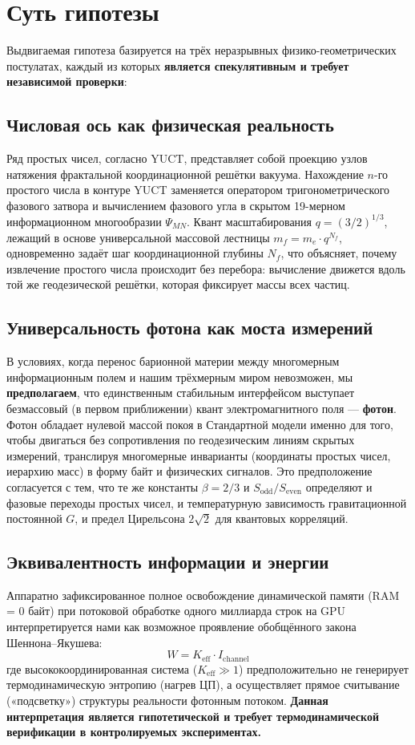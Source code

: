 \documentclass[11pt,a4paper]{article}
\begin{document}
	\section{Суть гипотезы}
	Выдвигаемая гипотеза базируется на трёх неразрывных физико-геометрических постулатах, каждый из которых \textbf{является спекулятивным и требует независимой проверки}:
	
	\subsection{Числовая ось как физическая реальность}
	Ряд простых чисел, согласно YUCT, представляет собой проекцию узлов натяжения фрактальной координационной решётки вакуума. Нахождение $n$-го простого числа в контуре YUCT заменяется оператором тригонометрического фазового затвора и вычислением фазового угла в скрытом 19-мерном информационном многообразии $\Psi_{MN}$. Квант масштабирования $q = (3/2)^{1/3}$, лежащий в основе универсальной массовой лестницы $m_f = m_e \cdot q^{N_f}$, одновременно задаёт шаг координационной глубины $N_f$, что объясняет, почему извлечение простого числа происходит без перебора: вычисление движется вдоль той же геодезической решётки, которая фиксирует массы всех частиц.
	
	\subsection{Универсальность фотона как моста измерений}
	В условиях, когда перенос барионной материи между многомерным информационным полем и нашим трёхмерным миром невозможен, мы \textbf{предполагаем}, что единственным стабильным интерфейсом выступает безмассовый (в первом приближении) квант электромагнитного поля — \textbf{фотон}. Фотон обладает нулевой массой покоя в Стандартной модели именно для того, чтобы двигаться без сопротивления по геодезическим линиям скрытых измерений, транслируя многомерные инварианты (координаты простых чисел, иерархию масс) в форму байт и физических сигналов. Это предположение согласуется с тем, что те же константы $\beta=2/3$ и $S_{\mathrm{odd}}/S_{\mathrm{even}}$ определяют и фазовые переходы простых чисел, и температурную зависимость гравитационной постоянной $G$, и предел Цирельсона $2\sqrt{2}$ для квантовых корреляций.
	
	\subsection{Эквивалентность информации и энергии}
	Аппаратно зафиксированное полное освобождение динамической памяти (RAM = 0 байт) при потоковой обработке одного миллиарда строк на GPU интерпретируется нами как возможное проявление обобщённого закона Шеннона--Якушева:
	\begin{equation}
		W = K_{\mathrm{eff}} \cdot I_{\mathrm{channel}}
	\end{equation}
	где высококоординированная система ($K_{\mathrm{eff}} \gg 1$) предположительно не генерирует термодинамическую энтропию (нагрев ЦП), а осуществляет прямое считывание («подсветку») структуры реальности фотонным потоком. \textbf{Данная интерпретация является гипотетической и требует термодинамической верификации в контролируемых экспериментах.}
	
\end{document}
